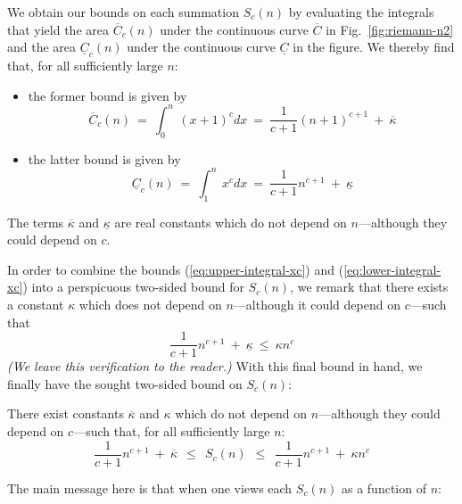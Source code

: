 We obtain our bounds on each summation $S_c(n)$ by evaluating the integrals that yield the area $\overline{C}_c(n)$ under the continuous curve $\overline{C}$ in Fig.~\ref{fig:riemann-n2} and the area $\underline{C}_c(n)$ under the continuous curve $\underline{C}$ in the figure.  We thereby find that, for all sufficiently large $n$:
\begin{itemize}
\item
the former bound is given by
\begin{equation}
\label{eq:upper-integral-xc}
\overline{C}_c(n) \ = \
\int_0^n \ (x+1)^c dx \ = \
 \frac{1}{c+1} (n+1)^{c+1} \ + \ \overline{\kappa}
\end{equation}

\medskip\item
the latter bound is given by
\begin{equation}
\label{eq:lower-integral-xc}
\underline{C}_c(n) \ = \
\int_1^n \ x^c dx \ = \ \frac{1}{c+1} n^{c+1} \ + \ \underline{\kappa}
\end{equation}
\end{itemize}
The terms $\overline{\kappa}$ and $\underline{\kappa}$ are real constants which do not depend on $n$---although they could depend on $c$.

\smallskip

In order to combine the bounds (\ref{eq:upper-integral-xc}) and (\ref{eq:lower-integral-xc}) into a perspicuous two-sided bound for $S_c(n)$, we remark that there exists a constant $\kappa$ which does not depend on $n$---although it could depend on $c$---such that
\[ \frac{1}{c+1} n^{c+1} \ + \ \underline{\kappa} \ \leq \ \kappa n^c \]
{\em (We leave this verification to the reader.)}  With this final bound in hand, we finally have the sought two-sided bound on $S_c(n)$:

\begin{prop}
There exist constants $\overline{\kappa}$ and $\kappa$ which do not depend on $n$---although they could depend on $c$---such that, for all sufficiently large $n$:
\begin{equation}
\label{eq:bounds-sum-xc}
\frac{1}{c+1} n^{c+1} \ + \ \overline{\kappa}
  \ \ \leq \ \ S_c(n)
  \ \ \leq \ \ \frac{1}{c+1} n^{c+1} \ + \ \kappa n^c
\end{equation}
\end{prop}

\medskip

\noindent
The main message here is that when one views each $S_c(n)$ as a function of $n$:


